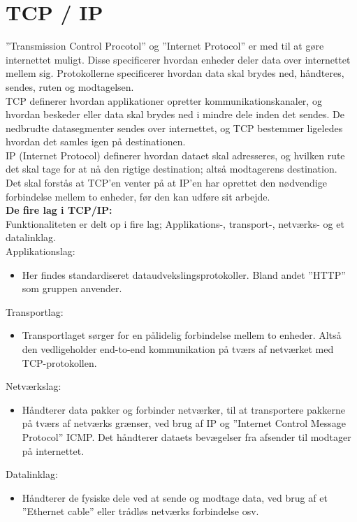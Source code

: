 \section{TCP / IP}\label{sec:tcp}
”Transmission Control Procotol” og ”Internet Protocol” \cite{TCP} er med til at gøre internettet muligt. 
Disse specificerer hvordan enheder deler data over internettet mellem sig. 
Protokollerne specificerer hvordan data skal brydes ned, håndteres, sendes, ruten og modtagelsen.\\

TCP definerer hvordan applikationer opretter kommunikationskanaler, 
og hvordan beskeder eller data skal brydes ned i mindre dele inden det sendes. 
De nedbrudte datasegmenter sendes over internettet, 
og TCP bestemmer ligeledes hvordan det samles igen på destinationen. \\

IP (Internet Protocol) definerer hvordan dataet skal adresseres, 
og hvilken rute det skal tage for at nå den rigtige destination; altså modtagerens destination. \\

Det skal forstås at TCP’en venter på at IP’en har oprettet den nødvendige forbindelse mellem to enheder, 
før den kan udføre sit arbejde. \\

\textbf{De fire lag i TCP/IP:} \\
Funktionaliteten er delt op i fire lag; Applikations-, transport-, netværks- og et datalinklag.\\

Applikationslag:
\begin{itemize}
    \item Her findes standardiseret dataudvekslingsprotokoller. Bland andet ”HTTP” som gruppen anvender.\\
\end{itemize} 

Transportlag:
\begin{itemize}
    \item Transportlaget sørger for en pålidelig forbindelse mellem to enheder. 
    Altså den vedligeholder end-to-end kommunikation på tværs af netværket med TCP-protokollen.\\
\end{itemize}

Netværkslag:
\begin{itemize}
    \item Håndterer data pakker og forbinder netværker, 
    til at transportere pakkerne på tværs af netværks grænser, 
    ved brug af IP og ”Internet Control Message Protocol” ICMP. 
    Det håndterer dataets bevægelser fra afsender til modtager på internettet.\\
\end{itemize}

Datalinklag:
\begin{itemize}
    \item Håndterer de fysiske dele ved at sende og modtage data, 
    ved brug af et ”Ethernet cable” eller trådløs netværks forbindelse osv.\\
\end{itemize}

